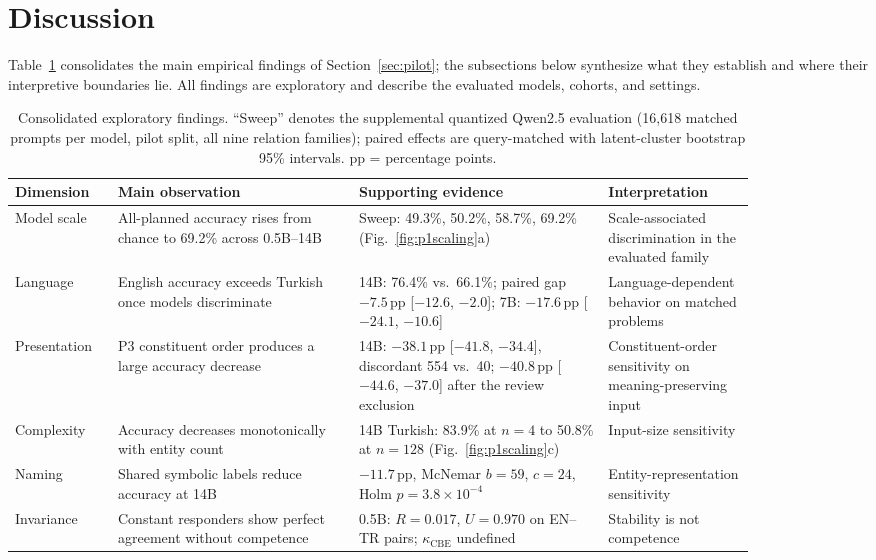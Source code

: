 \section{Discussion}
\label{sec:discussion}

Table~\ref{tab:findings} consolidates the main empirical findings of Section~\ref{sec:pilot}; the
subsections below synthesize what they establish and where their interpretive boundaries lie. All findings are exploratory and describe the evaluated models, cohorts, and settings.

\begin{table}[t]
  \centering
  \caption{Consolidated exploratory findings. ``Sweep'' denotes the supplemental quantized Qwen2.5
  evaluation (16,618 matched prompts per model, pilot split, all nine relation families); paired effects
  are query-matched with latent-cluster bootstrap 95\% intervals. pp = percentage points.}
  \label{tab:findings}
  \small
  \setlength{\tabcolsep}{4.5pt}
  \begin{tabular}{@{}p{0.105\linewidth}p{0.29\linewidth}p{0.295\linewidth}p{0.175\linewidth}@{}}
    \toprule
    Dimension & Main observation & Supporting evidence & Interpretation \\
    \midrule
    Model scale & All-planned accuracy rises from chance to 69.2\% across 0.5B--14B &
      Sweep: 49.3\%, 50.2\%, 58.7\%, 69.2\% (Fig.~\ref{fig:p1scaling}a) &
      Scale-associated discrimination in the evaluated family \\
    Language & English accuracy exceeds Turkish once models discriminate &
      14B: 76.4\% vs.\ 66.1\%; paired gap $-7.5$\,pp [$-12.6$, $-2.0$]; 7B: $-17.6$\,pp
      [$-24.1$, $-10.6$] & Language-dependent behavior on matched problems \\
    Presentation & P3 constituent order produces a large accuracy decrease &
      14B: $-38.1$\,pp [$-41.8$, $-34.4$], discordant 554 vs.\ 40; $-40.8$\,pp [$-44.6$, $-37.0$] after
      the review exclusion & Constituent-order sensitivity on meaning-preserving input \\
    Complexity & Accuracy decreases monotonically with entity count &
      14B Turkish: 83.9\% at $n{=}4$ to 50.8\% at $n{=}128$ (Fig.~\ref{fig:p1scaling}c) &
      Input-size sensitivity \\
    Naming & Shared symbolic labels reduce accuracy at 14B &
      $-11.7$\,pp, McNemar $b{=}59$, $c{=}24$, Holm $p = 3.8\times10^{-4}$ &
      Entity-representation sensitivity \\
    Invariance & Constant responders show perfect agreement without competence &
      0.5B: $R = 0.017$, $U = 0.970$ on EN--TR pairs; $\kappa_{\mathrm{CBE}}$ undefined &
      Stability is not competence \\
    \bottomrule
  \end{tabular}
\end{table}

